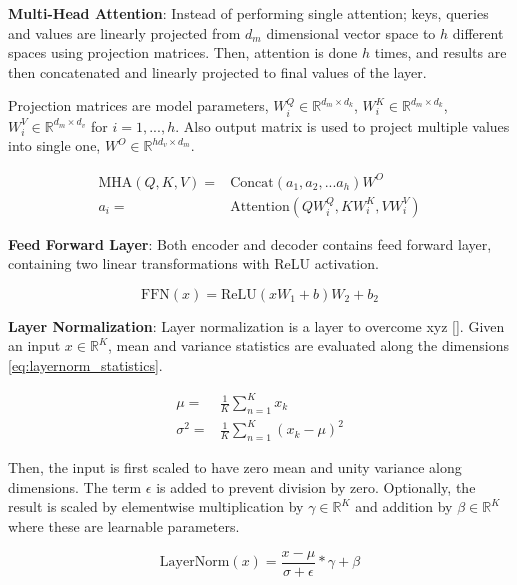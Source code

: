 \textbf{Multi-Head Attention}: Instead of performing single attention; keys, queries and values are linearly projected from $d_m$ dimensional vector space to $h$ different spaces using projection matrices. Then, attention is done $h$ times, and results are then concatenated and linearly projected to final values of the layer.

Projection matrices are model parameters, $W^Q_i \in \mathbb{R}^{d_m \times d_k}$, $W^K_i \in \mathbb{R}^{d_m \times d_k}$, $W^V_i \in \mathbb{R}^{d_m \times d_v}$ for $i=1,...,h$. Also output matrix is used to project multiple values into single one, $W^O \in \mathbb{R}^{h d_v \times d_m}$.

\begin{equation}
\begin{split}
\mathrm{MHA}(Q,K,V)= & \mathrm{Concat}(a_1, a_2, ... a_h)W^O \\
a_i = & \mathrm{Attention}(QW^Q_i,KW^K_i,VW^V_i)
\end{split}
\end{equation}

\textbf{Feed Forward Layer}: Both encoder and decoder contains feed forward layer, containing two linear transformations with ReLU activation.

\begin{equation}
\mathrm{FFN}(x) = \mathrm{ReLU}(xW_1+b)W_2+b_2
\end{equation}

\textbf{Layer Normalization}: Layer normalization is a layer to overcome xyz []. Given an input $x \in \mathbb{R}^K$, mean and variance statistics are evaluated along the dimensions \eqref{eq:layernorm_statistics}.

\begin{equation}
\label{eq:layernorm_statistics}
\begin{split}
\mu = & \frac{1}{K} \sum_{n=1}^{K} x_k \\
\sigma^2 = & \frac{1}{K} \sum_{n=1}^{K} (x_k-\mu)^2
\end{split}
\end{equation} 

Then, the input is first scaled to have zero mean and unity variance along dimensions. The term $\epsilon$ is added to prevent division by zero. Optionally, the result is scaled by elementwise multiplication by $\gamma \in \mathbb{R}^K$ and addition by $\beta \in \mathbb{R}^K$ where these are learnable parameters. 

\begin{equation}
\label{eqn:layernorm}
\mathrm{LayerNorm}(x) = \frac{x-\mu}{\sigma+\epsilon} * \gamma + \beta
\end{equation}

